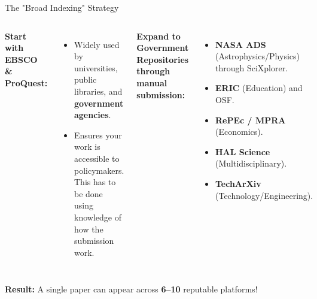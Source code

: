 \documentclass[10pt, aspectratio=169]{beamer}
\begin{document}
	\begin{frame}{The "Broad Indexing" Strategy}
		\begin{columns}[T]
			\textbf{Start with EBSCO \& ProQuest:}
			\begin{itemize}
				\item Widely used by universities, public libraries, and \textbf{government agencies}.
				\item Ensures your work is accessible to policymakers. This has to be done using knowledge of how the submission work.
			\end{itemize}
			
			\vspace{0.3cm}
			\textbf{Expand to Government Repositories through manual submission:}
	\begin{itemize}
		\item \textbf{NASA ADS} (Astrophysics/Physics) through SciXplorer.
		\item \textbf{ERIC} (Education) and OSF.
		\item \textbf{RePEc / MPRA} (Economics).
		\item \textbf{HAL Science} (Multidisciplinary).
		\item \textbf{TechArXiv} (Technology/Engineering).
	\end{itemize}
		\end{columns}
		\begin{center}
			\textbf{Result:} A single paper can appear across \textcolor{myblue}{\textbf{6–10}} reputable platforms!
		\end{center}
	\end{frame}
	
\end{document}
